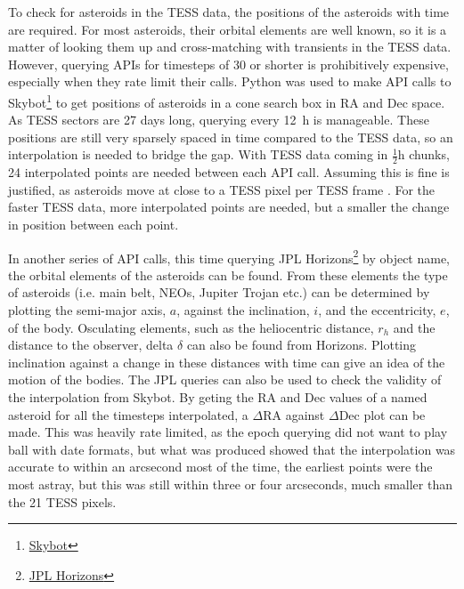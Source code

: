 \documentclass[12pt]{article}
\begin{document}
To check for asteroids in the TESS data, the positions of the asteroids with time are required.
For most asteroids, their orbital elements are well known, so it is a matter of looking them up and cross-matching with transients in the TESS data.
However, querying APIs for timesteps of \qty{30}{\min} or shorter is
prohibitively expensive, especially when they rate limit their calls.
Python was used to make API calls to {Skybot}\footnote{\href{https://vo.imcce.fr/webservices/skybot/}{Skybot}} to get positions of asteroids in a cone search box in RA and Dec space.
As TESS sectors are 27%
days long, querying every \qty{12}{\hour} is manageable.
These positions are still very sparsely spaced in time compared to the TESS data, so an interpolation is needed to bridge the gap.
With TESS data coming in $\frac12\unit{\hour}$ chunks, 24 interpolated points are needed between each API call.
Assuming this is fine is justified, as asteroids move at close to a TESS pixel per TESS frame \citep{Pal2018,Pal2020}.
For the faster TESS data, more interpolated points are needed, but a smaller the change in position between each point.


In another series of API calls, this time querying {JPL Horizons}\footnote{\href{https://ssd.jpl.nasa.gov/horizons/}{JPL Horizons}} by object name, the orbital elements of the asteroids can be found.
From these elements the type of asteroids (i.e. main belt, NEOs, Jupiter Trojan etc.) can be determined by plotting the semi-major axis, $a$, against the inclination, $i$, and the eccentricity, $e$, of the body.
Osculating elements, such as the heliocentric distance, $r_h$ and the distance to the observer, delta $\delta$%
can also be found from Horizons.
Plotting inclination against a change in these distances with time can give an idea of the motion of the bodies.
The JPL queries can also be used to check the validity of the interpolation from Skybot.
By geting the RA and Dec values of a named asteroid for all the timesteps interpolated, a $\Delta$RA against $\Delta$Dec plot can be made.
This was heavily rate limited, as the epoch querying did not want to play ball with date formats, but what was produced showed that the interpolation was accurate to within an arcsecond most of the time, the earliest points were the most astray, but this was still within three or four arcseconds, much smaller than the \qty{21}{\arcsec} TESS pixels.

\end{document}
